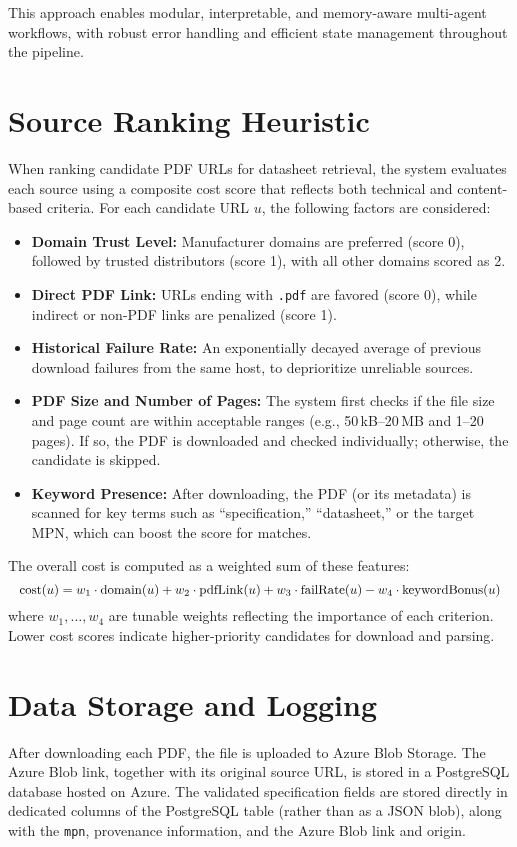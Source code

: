 This approach enables modular, interpretable, and memory-aware multi-agent workflows, with robust error handling and efficient state management throughout the pipeline.

\section{Source Ranking Heuristic}
When ranking candidate PDF URLs for datasheet retrieval, the system evaluates each source using a composite cost score that reflects both technical and content-based criteria. For each candidate URL $u$, the following factors are considered:
\begin{itemize}
    \item \textbf{Domain Trust Level:} Manufacturer domains are preferred (score 0), followed by trusted distributors (score 1), with all other domains scored as 2.
    \item \textbf{Direct PDF Link:} URLs ending with \texttt{.pdf} are favored (score 0), while indirect or non-PDF links are penalized (score 1).
    \item \textbf{Historical Failure Rate:} An exponentially decayed average of previous download failures from the same host, to deprioritize unreliable sources.
    \item \textbf{PDF Size and Number of Pages:} The system first checks if the file size and page count are within acceptable ranges (e.g., 50\,kB--20\,MB and 1--20 pages). If so, the PDF is downloaded and checked individually; otherwise, the candidate is skipped.
    \item \textbf{Keyword Presence:} After downloading, the PDF (or its metadata) is scanned for key terms such as ``specification,'' ``datasheet,'' or the target MPN, which can boost the score for matches.
\end{itemize}
The overall cost is computed as a weighted sum of these features:
\begin{equation}
\label{eq:heuristic}
\resizebox{\linewidth}{!}{$
\mathrm{cost}(u) = w_1 \cdot \mathrm{domain}(u) + w_2 \cdot \mathrm{pdfLink}(u) + w_3 \cdot \mathrm{failRate}(u) - w_4 \cdot \mathrm{keywordBonus}(u)
$}
\end{equation}
where $w_1, \ldots, w_4$ are tunable weights reflecting the importance of each criterion. Lower cost scores indicate higher-priority candidates for download and parsing.

\section{Data Storage and Logging}
After downloading each PDF, the file is uploaded to Azure Blob Storage. The Azure Blob link, together with its original source URL, is stored in a PostgreSQL database hosted on Azure. The validated specification fields are stored directly in dedicated columns of the PostgreSQL table (rather than as a JSON blob), along with the \verb|mpn|, provenance information, and the Azure Blob link and origin.

